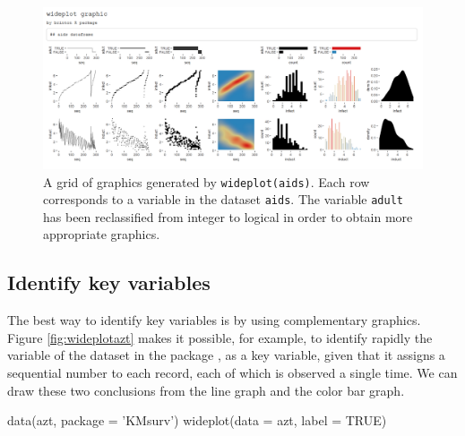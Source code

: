 \begin{Schunk}
	\begin{figure}[H]
\includegraphics[width=0.8\linewidth]{figures/wideplot_aids2} \caption[Output of 'wideplot(aids)']{A grid of graphics generated by \texttt{wideplot(aids)}. Each row corresponds to a variable in the dataset \texttt{aids}. The variable \texttt{adult} has been reclassified from integer to logical in order to obtain more appropriate graphics.}\label{fig:wideplotaids3}
	\end{figure}
\end{Schunk}

\hypertarget{identify-key-variables}{%
	\subsection{Identify key variables}\label{identify-key-variables}}

The best way to identify key variables is by using complementary
graphics. Figure \ref{fig:wideplotazt} makes it possible, for example,
to identify rapidly the variable  of the dataset
 in the package , as a key variable, given that it
assigns a sequential number to each record, each of which is observed a
single time. We can draw these two conclusions from the line graph and
the color bar graph.

\begin{example}
  data(azt, package = 'KMsurv')
  wideplot(data = azt, label = TRUE)
\end{example}


